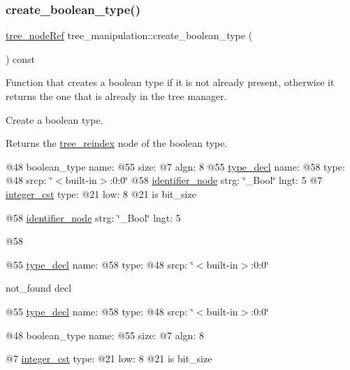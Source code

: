 \mbox{\label{classtree__manipulation_a280d82a49475253523e487b0a68d77c1}} 
\subsubsection{\texorpdfstring{create\+\_\+boolean\+\_\+type()}{create\_boolean\_type()}}
{\footnotesize\ttfamily \hyperlink{tree__node_8hpp_a6ee377554d1c4871ad66a337eaa67fd5}{tree\+\_\+node\+Ref} tree\+\_\+manipulation\+::create\+\_\+boolean\+\_\+type (\begin{DoxyParamCaption}{ }\end{DoxyParamCaption}) const}



Function that creates a boolean type if it is not already present, otherwise it returns the one that is already in the tree manager. 

Create a boolean type.

\begin{DoxyReturn}{Returns}
the \hyperlink{classtree__reindex}{tree\+\_\+reindex} node of the boolean type. 
\end{DoxyReturn}
@48 boolean\+\_\+type name\+: @55 size\+: @7 algn\+: 8 @55 \hyperlink{structtype__decl}{type\+\_\+decl} name\+: @58 type\+: @48 srcp\+: \char`\"{}$<$built-\/in$>$\+:0\+:0\char`\"{} @58 \hyperlink{structidentifier__node}{identifier\+\_\+node} strg\+: \char`\"{}\+\_\+\+Bool\char`\"{} lngt\+: 5 @7 \hyperlink{structinteger__cst}{integer\+\_\+cst} type\+: @21 low\+: 8 @21 is bit\+\_\+size

@58 \hyperlink{structidentifier__node}{identifier\+\_\+node} strg\+: \char`\"{}\+\_\+\+Bool\char`\"{} lngt\+: 5

@58

@55 \hyperlink{structtype__decl}{type\+\_\+decl} name\+: @58 type\+: @48 srcp\+: \char`\"{}$<$built-\/in$>$\+:0\+:0\char`\"{}

not\+\_\+found decl

@55 \hyperlink{structtype__decl}{type\+\_\+decl} name\+: @58 type\+: @48 srcp\+: \char`\"{}$<$built-\/in$>$\+:0\+:0\char`\"{}

@48 boolean\+\_\+type name\+: @55 size\+: @7 algn\+: 8

@7 \hyperlink{structinteger__cst}{integer\+\_\+cst} type\+: @21 low\+: 8 @21 is bit\+\_\+size 

